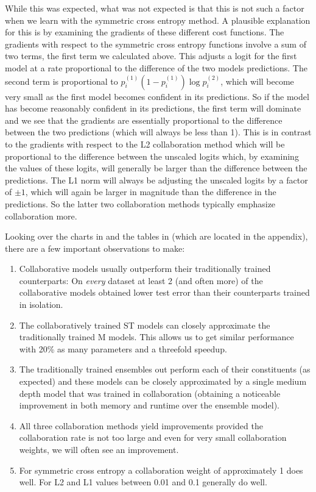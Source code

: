 \documentclass[english,a4paper,oneside]{amsart}
\theoremstyle{definition}
\begin{document}
While this was expected, what was not expected is that this is not such a factor when we learn with the symmetric cross entropy method.  A plausible explanation for this is by examining the gradients of these different cost functions. The gradients with respect to the symmetric cross entropy functions involve a sum of two terms, the first term we calculated above. This adjusts a logit for the first model at a rate proportional to the difference of the two models predictions. The second term is proportional to $p_i^{(1)}(1-p_i^{(1)})\log p_i^{(2)}$, which will become very small as the first model becomes confident in its predictions. So if the model has become reasonably confident in its predictions, the first term will dominate and we see that the gradients are essentially proportional to the difference between the two predictions (which will always be less than 1). This is in contrast to the gradients with respect to the L2 collaboration method which will be proportional to the difference between the unscaled logits which, by examining the values of these logits, will generally be larger than the difference between the predictions. The L1 norm will always be adjusting the unscaled logits by a factor of $\pm 1$, which will again be larger in magnitude than the difference in the predictions. So the latter two collaboration methods typically emphasize collaboration more.

Looking over the charts in  and the tables in  (which are located in the appendix), there are a few important observations to make:
\begin{enumerate}
	\item Collaborative models usually outperform their traditionally trained counterparts: On \emph{every} dataset at least 2 (and often more) of the collaborative models obtained lower test error than their counterparts trained in isolation.
	\item The collaboratively trained ST models can closely approximate the traditionally trained M models. This allows us to get similar performance with 20\% as many parameters and a threefold speedup.
	\item The traditionally trained ensembles out perform each of their constituents (as expected) and these models can be closely approximated by a single medium depth model that was trained in collaboration (obtaining a noticeable improvement in both memory and runtime over the ensemble model).
	\item All three collaboration methods yield improvements provided the collaboration rate is not too large and even for very small collaboration weights, we will often see an improvement.
	\item For symmetric cross entropy a collaboration weight of approximately 1 does well. For L2 and L1 values between 0.01 and 0.1 generally do well.
\end{enumerate}
\end{document}

